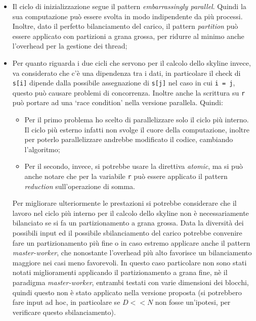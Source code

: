 \documentclass[11pt, a4paper]{article}
\begin{document}
\begin{itemize}
  \item Il ciclo di inizializzazione segue il pattern \textit{embarrassingly parallel}.
        Quindi la sua computazione può essere svolta in modo indipendente da più processi.
        Inoltre, dato il perfetto bilanciamento del carico, il pattern \textit{partition} può essere applicato con partizioni
        a grana grossa, per ridurre al minimo anche l'overhead per la gestione dei thread;
  \item Per quanto riguarda i due cicli che servono per il calcolo dello skyline invece, va considerato che c'è una dipendenza tra
        i dati, in particolare il check di \texttt{s[i]} dipende dalla possibile assegnazione di \texttt{s[j]} nel caso in cui
        \texttt{i = j}, questo può causare problemi di concorrenza.
        Inoltre anche la scrittura su \texttt{r} può portare ad una `race condition' nella versione parallela.
        Quindi:
        \begin{itemize}
          \item Per il primo problema ho scelto di parallelizzare solo il ciclo più interno. Il ciclo più esterno infatti non
                svolge il cuore della computazione, inoltre per poterlo parallelizzare andrebbe modificato il codice, cambiando
                l'algoritmo;
          \item Per il secondo, invece, si potrebbe usare la direttiva \textit{atomic}, ma si può anche notare che per la
                variabile \texttt{r} può essere applicato il pattern \textit{reduction} sull'operazione di somma.
        \end{itemize}
        Per migliorare ulteriormente le prestazioni si potrebbe considerare che il lavoro nel ciclo più interno per il calcolo
        dello skyline non è necessariamente bilanciato se si fa un partizionamento a grana grossa.
        Data la diversità dei possibili input ed il possibile sbilanciamento del carico potrebbe convenire fare un partizionamento
        più fine o in caso estremo applicare anche il pattern \textit{master-worker}, che nonostante l'overhead più alto favorisce
        un bilanciamento maggiore nei casi meno favorevoli.
        In questo caso particolare non sono stati notati miglioramenti applicando il partizionamento a grana fine, nè il paradigma
        \textit{master-worker}, entrambi testati con varie dimensioni dei blocchi, quindi questo non è stato applicato nella
        versione proposta (si potrebbero fare input ad hoc, in particolare se \(D << N\) non fosse un'ipotesi, per verificare
        questo sbilanciamento).
\end{itemize}
\end{document}
